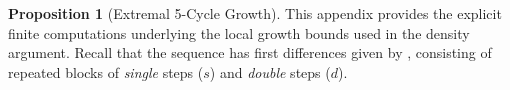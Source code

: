 \documentclass[12pt, oneside]{article}
\numberwithin{equation}{section}
\theoremstyle{definition}
\newtheorem{proposition}{Proposition}[section]
\theoremstyle{plain}
\theoremstyle{remark}
\begin{document}
\begin{proposition}[Extremal 5-Cycle Growth]
This appendix provides the explicit finite computations underlying the local
growth bounds used in the density argument. Recall that the sequence 
has first differences given by , consisting of repeated blocks of
\emph{single} steps ($s$) and \emph{double} steps ($d$).











\end{proposition}
\end{document}
